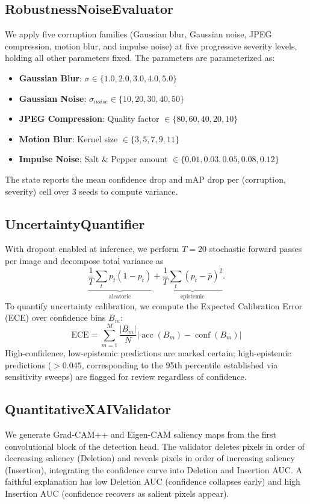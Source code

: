 \documentclass[10pt,twocolumn,letterpaper]{article}
\begin{document}
\subsection{RobustnessNoiseEvaluator}
We apply five corruption families (Gaussian blur, Gaussian noise, JPEG compression, motion blur, and impulse noise) at five progressive severity levels, holding all other parameters fixed. The parameters are parameterized as:
\begin{itemize}
    \item \textbf{Gaussian Blur}: $\sigma \in \{1.0, 2.0, 3.0, 4.0, 5.0\}$
    \item \textbf{Gaussian Noise}: $\sigma_{noise} \in \{10, 20, 30, 40, 50\}$
    \item \textbf{JPEG Compression}: Quality factor $\in \{80, 60, 40, 20, 10\}$
    \item \textbf{Motion Blur}: Kernel size $\in \{3, 5, 7, 9, 11\}$
    \item \textbf{Impulse Noise}: Salt \& Pepper amount $\in \{0.01, 0.03, 0.05, 0.08, 0.12\}$
\end{itemize}
The state reports the mean confidence drop and mAP drop per (corruption, severity) cell over 3 seeds to compute variance.

\subsection{UncertaintyQuantifier}
With dropout enabled at inference, we perform $T=20$ stochastic forward passes per image and decompose total variance as
\begin{equation}
    \underbrace{\frac{1}{T}\sum_{t} p_t(1-p_t)}_{\text{aleatoric}} + \underbrace{\frac{1}{T}\sum_{t} (p_t - \bar{p})^2}_{\text{epistemic}}.
\end{equation}
To quantify uncertainty calibration, we compute the Expected Calibration Error (ECE) over confidence bins $B_m$:
\begin{equation}
    \text{ECE} = \sum_{m=1}^{M} \frac{|B_m|}{N} \Big| \operatorname{acc}(B_m) - \operatorname{conf}(B_m) \Big|
\end{equation}
High-confidence, low-epistemic predictions are marked certain; high-epistemic predictions ($> 0.045$, corresponding to the 95th percentile established via sensitivity sweeps) are flagged for review regardless of confidence.

\subsection{QuantitativeXAIValidator}
We generate Grad-CAM++ and Eigen-CAM saliency maps from the first convolutional block of the detection head. The validator deletes pixels in order of decreasing saliency (Deletion) and reveals pixels in order of increasing saliency (Insertion), integrating the confidence curve into Deletion and Insertion AUC. A faithful explanation has low Deletion AUC (confidence collapses early) and high Insertion AUC (confidence recovers as salient pixels appear).
\end{document}
